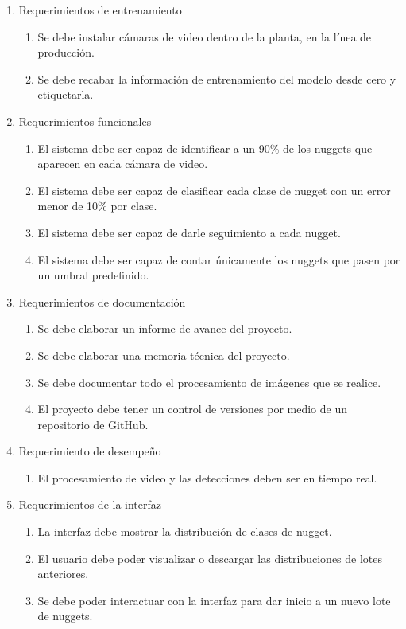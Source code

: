 \documentclass[
11pt, %
]{charter}
\begin{document}
\begin{enumerate}
	\item Requerimientos de entrenamiento
		\begin{enumerate}
		\item Se debe instalar cámaras de video dentro de la planta, en la línea de producción.
		\item Se debe recabar la información de entrenamiento del modelo desde cero y etiquetarla.
		\end{enumerate}
	\item Requerimientos funcionales
		\begin{enumerate}
		\item El sistema debe ser capaz de identificar a un 90\% de los nuggets que aparecen en cada cámara de video.
		\item El sistema debe ser capaz de clasificar cada clase de nugget con un error menor de 10\% por clase.
		\item El sistema debe ser capaz de darle seguimiento a cada nugget.
		\item El sistema debe ser capaz de contar únicamente los nuggets que pasen por un umbral predefinido.
		\end{enumerate}
	\item Requerimientos de documentación
		\begin{enumerate}
		\item Se debe elaborar un informe de avance del proyecto.
		\item Se debe elaborar una memoria técnica del proyecto.
		\item Se debe documentar todo el procesamiento de imágenes que se realice.
		\item El proyecto debe tener un control de versiones por medio de un repositorio de GitHub.
		\end{enumerate}
	\item Requerimiento de desempeño
		\begin{enumerate}
		\item El procesamiento de video y las detecciones deben ser en tiempo real.
		\end{enumerate}
	\item Requerimientos de la interfaz
		\begin{enumerate}
		\item La interfaz debe mostrar la distribución de clases de nugget.
		\item El usuario debe poder visualizar o descargar las distribuciones de lotes anteriores.
		\item Se debe poder interactuar con la interfaz para dar inicio a un nuevo lote de nuggets.
		\end{enumerate}
\end{enumerate}
\end{document}

